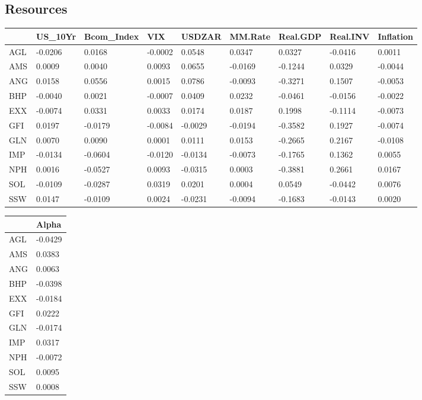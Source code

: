 \documentclass[11pt,preprint, authoryear]{elsarticle}
\let\origtable\table
\let\endorigtable\endtable
\renewenvironment{table}[1][2] {
    \expandafter\origtable\expandafter[H]
} {
    \endorigtable
}
\numberwithin{equation}{section}
\numberwithin{figure}{section}
\numberwithin{table}{section}
\begin{document}
\newpage

\hypertarget{resources}{%
\subsection{Resources}\label{resources}}

\begin{table}[H]

\caption{\label{tab:Beta_R}Factor Beta's: Resources}
\centering
\begin{tabular}[t]{l|l|l|l|l|l|l|l|l}
\hline
  & US\_10Yr & Bcom\_Index & VIX & USDZAR & MM.Rate & Real.GDP & Real.INV & Inflation\\
\hline
AGL & -0.0206 & 0.0168 & -0.0002 & 0.0548 & 0.0347 & 0.0327 & -0.0416 & 0.0011\\
\hline
AMS & 0.0009 & 0.0040 & 0.0093 & 0.0655 & -0.0169 & -0.1244 & 0.0329 & -0.0044\\
\hline
ANG & 0.0158 & 0.0556 & 0.0015 & 0.0786 & -0.0093 & -0.3271 & 0.1507 & -0.0053\\
\hline
BHP & -0.0040 & 0.0021 & -0.0007 & 0.0409 & 0.0232 & -0.0461 & -0.0156 & -0.0022\\
\hline
EXX & -0.0074 & 0.0331 & 0.0033 & 0.0174 & 0.0187 & 0.1998 & -0.1114 & -0.0073\\
\hline
GFI & 0.0197 & -0.0179 & -0.0084 & -0.0029 & -0.0194 & -0.3582 & 0.1927 & -0.0074\\
\hline
GLN & 0.0070 & 0.0090 & 0.0001 & 0.0111 & 0.0153 & -0.2665 & 0.2167 & -0.0108\\
\hline
IMP & -0.0134 & -0.0604 & -0.0120 & -0.0134 & -0.0073 & -0.1765 & 0.1362 & 0.0055\\
\hline
NPH & 0.0016 & -0.0527 & 0.0093 & -0.0315 & 0.0003 & -0.3881 & 0.2661 & 0.0167\\
\hline
SOL & -0.0109 & -0.0287 & 0.0319 & 0.0201 & 0.0004 & 0.0549 & -0.0442 & 0.0076\\
\hline
SSW & 0.0147 & -0.0109 & 0.0024 & -0.0231 & -0.0094 & -0.1683 & -0.0143 & 0.0020\\
\hline
\end{tabular}
\end{table}

\begin{table}[H]

\caption{\label{tab:Alpha_R}Factor Alpha's: Resources}
\centering
\begin{tabular}[t]{l|l}
\hline
  & Alpha\\
\hline
AGL & -0.0429\\
\hline
AMS & 0.0383\\
\hline
ANG & 0.0063\\
\hline
BHP & -0.0398\\
\hline
EXX & -0.0184\\
\hline
GFI & 0.0222\\
\hline
GLN & -0.0174\\
\hline
IMP & 0.0317\\
\hline
NPH & -0.0072\\
\hline
SOL & 0.0095\\
\hline
SSW & 0.0008\\
\hline
\end{tabular}
\end{table}
\end{document}

